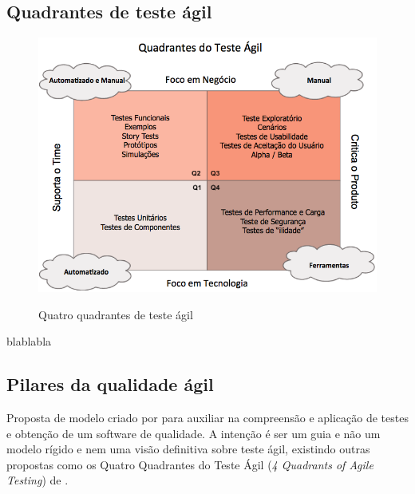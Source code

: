 \documentclass[
	12pt,				%
	openright,			%
	oneside,			%
	a4paper,			%
	english,			%
	brazil,				%
	]{abntex2}
\begin{document}

\subsection{Quadrantes de teste ágil}
\begin{figure}[H]
    \centering
    \caption{Quatro quadrantes de teste ágil}
    \graphicspath{ {./graphics/agile/} }
    \includegraphics[scale=0.6]{Quadrante-Teste-Agil}
    \label{fig:quatro-quadrantes}
\end{figure}

blablabla

\subsection{Pilares da qualidade ágil}
Proposta de modelo criado por  para auxiliar na compreensão e aplicação de testes e obtenção de um software de qualidade. A intenção é ser um guia e não um modelo rígido e nem uma visão definitiva sobre teste ágil, existindo outras propostas como os Quatro Quadrantes do Teste Ágil (\emph{4 Quadrants of Agile Testing}) de .
\end{document}
